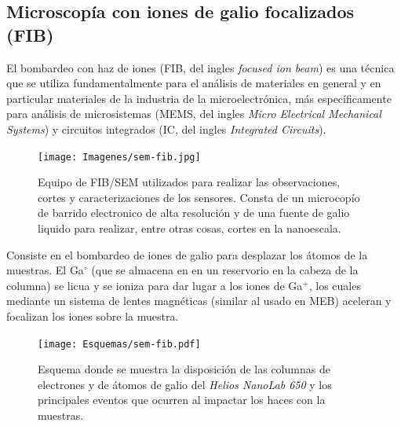 	\subsection{Microscopía con iones de galio focalizados (FIB)}\label{sec:FIB}

		El bombardeo con haz de iones (FIB, del ingles \textit{focused ion beam}) es una técnica que se utiliza fundamentalmente para el análisis de materiales en general y en particular materiales de la industria de la microelectrónica, más específicamente para análisis de microsistemas (MEMS, del ingles \textit{Micro Electrical Mechanical Systems}) y circuitos integrados (IC, del ingles \textit{Integrated Circuits}).

			\begin{figure}[ht]
			 		  \begin{center}
			 		  \texttt{[image: Imagenes/sem-fib.jpg]}
			 		  \caption[Microscopio de doble haz FIB/SEM]{Equipo de FIB/SEM utilizados para realizar las observaciones, cortes y caracterizaciones de los sensores. Consta de un microcopío de barrido electronico de alta resolución y de una fuente de galio liquido para realizar, entre otras cosas, cortes en la nanoescala.}
			 		  \label{fig:sem-fib}
			 		  \end{center}
			 		  \end{figure}

		Consiste en el bombardeo de iones de galio para desplazar los átomos de la muestras. El Ga$^{\circ}$ (que se almacena en en un reservorio en la cabeza de la columna) se licua y se ioniza para dar lugar a los iones de Ga${^+}$, los cuales mediante un sistema de lentes magnéticas (similar al usado en MEB)  aceleran y focalizan los iones sobre la muestra. 

		\begin{figure}[ht!]
			 		  \begin{center}
			 		  \texttt{[image: Esquemas/sem-fib.pdf]}
			 		  \caption[Esquema de las microscopia\index{microscopía}s FIB/SEM]{Esquema donde se muestra la disposición de las columnas de electrones y de átomos de galio del \textit{Helios NanoLab 650} y los principales eventos que ocurren al impactar los haces con la muestras.}
			 		  \label{esq:sem-fib}
			 		  \end{center}
			 		  \end{figure}


